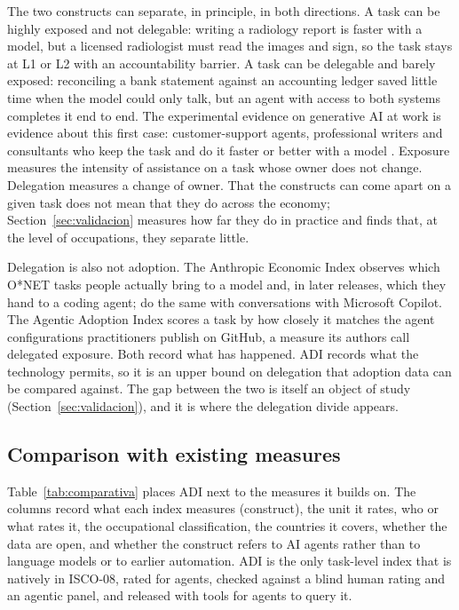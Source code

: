 The two constructs can separate, in principle, in both directions.
A task can be highly exposed and not delegable: writing a radiology report is faster with a model, but a licensed radiologist must read the images and sign, so the task stays at L1 or L2 with an accountability barrier.
A task can be delegable and barely exposed: reconciling a bank statement against an accounting ledger saved little time when the model could only talk, but an agent with access to both systems completes it end to end.
The experimental evidence on generative AI at work is evidence about this first case: customer-support agents, professional writers and consultants who keep the task and do it faster or better with a model \citep{brynjolfsson2023generative, noy2023experimental, dellacqua2023navigating}.
Exposure measures the intensity of assistance on a task whose owner does not change.
Delegation measures a change of owner.
That the constructs can come apart on a given task does not mean that they do across the economy; Section~\ref{sec:validacion} measures how far they do in practice and finds that, at the level of occupations, they separate little.

Delegation is also not adoption.
The Anthropic Economic Index \citep{aei2025economic, handa2025economic} observes which O*NET tasks people actually bring to a model and, in later releases, which they hand to a coding agent; \citet{tomlinson2025working} do the same with conversations with Microsoft Copilot.
The Agentic Adoption Index \citep{lee2026delegates} scores a task by how closely it matches the agent configurations practitioners publish on GitHub, a measure its authors call delegated exposure.
Both record what has happened.
ADI records what the technology permits, so it is an upper bound on delegation that adoption data can be compared against.
The gap between the two is itself an object of study (Section~\ref{sec:validacion}), and it is where the delegation divide appears.

\subsection{Comparison with existing measures}

Table~\ref{tab:comparativa} places ADI next to the measures it builds on.
The columns record what each index measures (construct), the unit it rates, who or what rates it, the occupational classification, the countries it covers, whether the data are open, and whether the construct refers to AI agents rather than to language models or to earlier automation.
ADI is the only task-level index that is natively in ISCO-08, rated for agents, checked against a blind human rating and an agentic panel, and released with tools for agents to query it.

